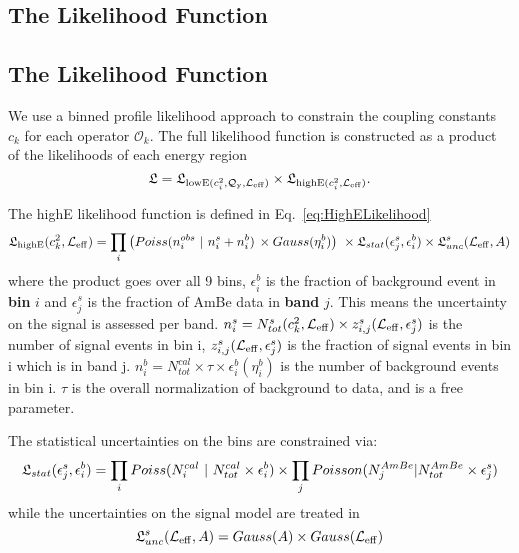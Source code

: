 \subsection{The Likelihood Function}
\subsection{The Likelihood Function}
\label{sec:LikelihoodFunction}
We use a binned profile likelihood approach to constrain the coupling constants $c_k$ for each operator $\mathcal{O}_k$. The full likelihood function is constructed as a product of the likelihoods of each energy region 
\begin{equation}
\label{eq:FullLikelihood}
\mathfrak{L} = \mathfrak{L}_{\mathrm{lowE}(c_i^2,\mathcal{Q}_{\mathrm{y}},\mathcal{L}_{\mathrm{eff}})} \times \mathfrak{L}_{\mathrm{highE}(c_i^2,\mathcal{L}_{\mathrm{eff}})}  .
\end{equation}

The highE likelihood function is defined in Eq.~\ref{eq:HighELikelihood}
\begin{equation}
\label{eq:HighELikelihood}
\mathfrak{L}_{\mathrm{highE}}(c_k^2,\mathcal{L}_{\mathrm{eff}}) = \prod_{i} \big( Poiss(n^{obs}_{i}~|~n^{s}_{i} + n^{b}_{i}) \, \times Gauss(\eta^{b}_{i}) \big) ~ \times \mathfrak{L}_{stat}(\epsilon^{s}_{j},\epsilon^{b}_{i}) \times \mathfrak{L}^s_{unc}(\mathcal{L}_{\mathrm{eff}}, A)
\end{equation}
where the product goes over all 9 bins, $\epsilon^{b}_{i}$ is the fraction of background event in \textbf{bin} $i$ and  $\epsilon^{s}_{j}$ is the fraction of AmBe data in \textbf{band} $j$. This means the uncertainty on the signal is assessed per band. $n_i^s = N_{tot}^s(c_k^2,\mathcal{L}_{\mathrm{eff}}) \times z_{i,j}^s(\mathcal{L}_{\mathrm{eff}} ,\epsilon^{s}_{j})$ is the number of signal events in bin i, $z_{i,j}^s(\mathcal{L}_{\mathrm{eff}}, \epsilon^{s}_{j})$ is the fraction of signal events in bin i which is in band j. $n_i^b = N_{tot}^{cal} \times \tau \times \epsilon^{b}_{i}(\eta^{b}_{i})$ is the number of background events in bin i. $\tau$ is the overall normalization of background to data, and is a free parameter.  

The statistical uncertainties on the bins are constrained via:
\begin{equation}
\label{eq:LstsatHighE}
\mathfrak{L}_{stat}(\epsilon^{s}_{j},\epsilon^{b}_{i}) = \prod_{i}Poiss(N_i^{cal}~|~N_{tot}^{cal} \times \epsilon^{b}_{i}) \times \prod_j Poisson(N_j^{AmBe} | N_{tot}^{AmBe} \times \epsilon^{s}_{j})
\end{equation}
while the uncertainties on the signal model are treated in 
\begin{equation}
\mathfrak{L}^s_{unc}(\mathcal{L}_{\mathrm{eff}}, A) = Gauss(A) \times Gauss(\mathcal{L}_{\mathrm{eff}})
\end{equation}

